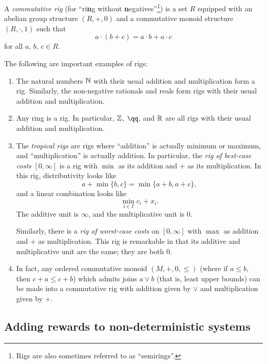 \documentclass[DynamicalBook]{subfiles}
\begin{document}
\begin{definition}
A \emph{commutative rig} (for ``ri{\textbf{n}}g without
{\textbf{n}}egatives''\footnote{Rigs are also sometimes referred to as ``semirings''.}) is a set $R$
equipped with an abelian group structure $(R, +, 0)$ and a commutative monoid structure $(R,
\cdot, 1)$ such that
\[
a \cdot (b + c) = a \cdot b + a \cdot c
\]
for all $a,\, b,\, c\in R$.
\end{definition}

\begin{example}
  The following are important examples of rigs:
  \begin{enumerate}
    \item The natural numbers $\mathbb{N}$ with their usual addition and multiplication
      form a rig. Similarly, the non-negative rationals and reals form rigs with
      their usual addition and multiplication. 
    \item Any ring is a rig. In particular, $\mathbb{Z}$, $\qq$, and $\mathbb{R}$ are all rigs
      with their usual addition and multiplication.
    \item The \emph{tropical rigs} are rigs where ``addition'' is actually
      minimum or maximum, and ``multiplication'' is actually addition. In
      particular, the \emph{rig of best-case costs} $[0, \infty]$ is a rig with $\min$ as its addition and $+$ as
      its multiplication. In this rig, distributivity looks like
      \[
a + \min\{b, c\} = \min\{a + b, a + c\},
      \]
      and a linear combination looks like
      \[ \min_{i \in I} c_i + x_i.\]
      The additive unit is $\infty$, and the multiplicative unit is $0$.

      Similarly, there is a \emph{rig of worst-case costs} on $[0,\infty]$ with
      $\max$ as addition and $+$ as multiplication. This rig is remarkable in
      that its additive and multiplicative unit are the same; they are both $0$.
   \item In fact, any ordered commutative monoid $(M, +, 0, \leq)$ (where if $a \leq
     b$, then $c + a \leq c + b$) which admits joins $a \vee b$ (that is, least
     upper bounds) can be made into a commutative rig with addition given by
     $\vee$ and multiplication given by $+$.
  \end{enumerate}
\end{example}


\subsection{Adding rewards to non-deterministic systems}
\end{document}
